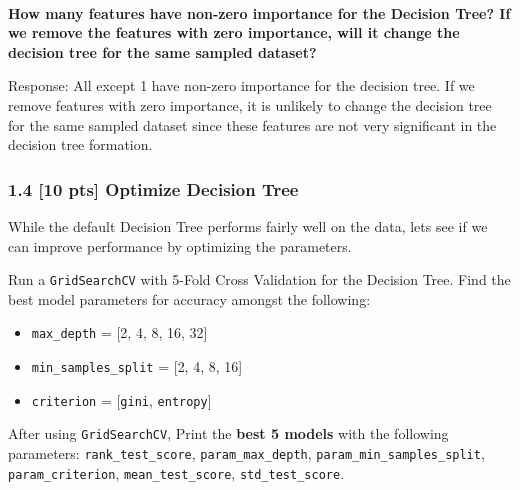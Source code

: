 \documentclass[11pt]{article}
\providecommand{\tightlist}{%
      \setlength{\itemsep}{0pt}\setlength{\parskip}{0pt}}
\begin{document}
    \begin{center}
    \end{center}
    { \hspace*{\fill} \\}
    
    \textbf{How many features have non-zero importance for the Decision
Tree? If we remove the features with zero importance, will it change the
decision tree for the same sampled dataset?}

    Response: All except 1 have non-zero importance for the decision tree.
If we remove features with zero importance, it is unlikely to change the
decision tree for the same sampled dataset since these features are not
very significant in the decision tree formation.

    \hypertarget{pts-optimize-decision-tree}{%
\subsubsection{1.4 {[}10 pts{]} Optimize Decision
Tree}\label{pts-optimize-decision-tree}}

While the default Decision Tree performs fairly well on the data, lets
see if we can improve performance by optimizing the parameters.

Run a \texttt{GridSearchCV} with 5-Fold Cross Validation for the
Decision Tree. Find the best model parameters for accuracy amongst the
following:

\begin{itemize}
\tightlist
\item
  \texttt{max\_depth} = {[}2, 4, 8, 16, 32{]}
\item
  \texttt{min\_samples\_split} = {[}2, 4, 8, 16{]}
\item
  \texttt{criterion} = {[}\texttt{gini}, \texttt{entropy}{]}
\end{itemize}

After using \texttt{GridSearchCV}, Print the \textbf{best 5 models} with
the following parameters: \texttt{rank\_test\_score},
\texttt{param\_max\_depth}, \texttt{param\_min\_samples\_split},
\texttt{param\_criterion}, \texttt{mean\_test\_score},
\texttt{std\_test\_score}.
\end{document}
